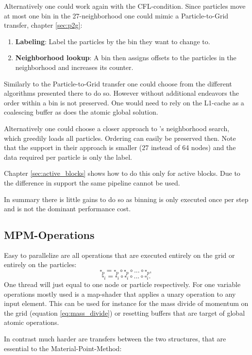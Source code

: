 \documentclass[m,times]{cgMA}
\begin{document}
Alternatively one could work again with the CFL-condition. Since particles move at most one bin in the 27-neighborhood one could mimic a Particle-to-Grid transfer, chapter \ref{sec:p2g}:
\begin{enumerate}
  \item \textbf{Labeling}: Label the particles by the bin they want to change to.
  \item \textbf{Neighborhood lookup}: A bin then assigns offsets to the particles in the neighborhood and increases its counter.
\end{enumerate}
Similarly to the Particle-to-Grid transfer one could choose from the different algorithms presented there to do so. However without additional endeavors the order within a bin is not preserved. One would need to rely on the L1-cache as a coalescing buffer as does the atomic global solution.

Alternatively one could choose a closer approach to \cite{NVIDIA:NNSEARCH}'s neighborhood search, which greedily loads all particles. Ordering can easily be preserved then. Note that the support in their approach is smaller (27 instead of 64 nodes) and the data required per particle is only the label.

Chapter \ref{sec:active_blocks} shows how to do this only for active blocks. Due to the difference in support the same pipeline cannot be used.

In summary there is little gains to do so as binning is only executed once per step and is not the dominant performance cost.

\subsection{MPM-Operations}\label{sec:transfers}
Easy to parallelize are all operations that are executed entirely on the grid or entirely on the particles:
$$\square_p = \square_p \circ \square_p \circ ... \circ \square_p,$$
$$\square_i = \square_i \circ \square_i \circ ... \circ \square_i.$$
One thread will just equal to one node or particle respectively. For one variable operations mostly used is a map-shader that applies a unary operation to any input element. This can be used for instance for the mass divide of momentum on the grid (equation \ref{eq:mass_divide}) or resetting buffers that are target of global atomic operations.

In contrast much harder are transfers between the two structures, that are essential to the Material-Point-Method:
\end{document}
